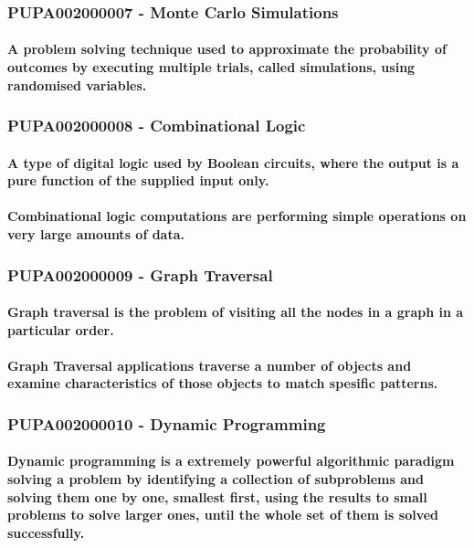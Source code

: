 \documentclass{acm_proc_article-sp}
\begin{document}
\subsubsection{PUPA002000007 - Monte Carlo Simulations}
\paragraph{A problem solving technique used to approximate the probability of outcomes by executing multiple trials, called simulations, using randomised variables.}
\subsubsection{PUPA002000008 - Combinational Logic}
\paragraph{A type of digital logic used by Boolean circuits, where the output is a pure function of the supplied input only.}
\paragraph{Combinational logic computations are performing simple operations on very large amounts of data.}
\subsubsection{PUPA002000009 - Graph Traversal}
\paragraph{Graph traversal is the problem of visiting all the nodes in a graph in a particular order.}
\paragraph{Graph Traversal applications traverse a number of objects and examine characteristics of those objects to match spesific patterns.}
\subsubsection{PUPA002000010 - Dynamic Programming}
\paragraph{Dynamic programming is a extremely powerful algorithmic paradigm solving a problem by identifying a collection of subproblems and solving them one by one, smallest first, using the results to small problems to solve larger ones, until the whole set of them is solved successfully.}
\end{document}
